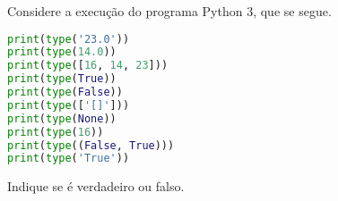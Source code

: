 \documentclass[12pt,varwidth=16cm,border=17pt]{standalone}
\begin{document}
Considere a execução do programa Python 3, que se segue. 

\begin{lstlisting}[language=Python]
print(type('23.0'))
print(type(14.0))
print(type([16, 14, 23]))
print(type(True))
print(type(False))
print(type(['[]']))
print(type(None))
print(type(16))
print(type((False, True)))
print(type('True'))
\end{lstlisting}

Indique se é verdadeiro ou falso.
\end{document}
